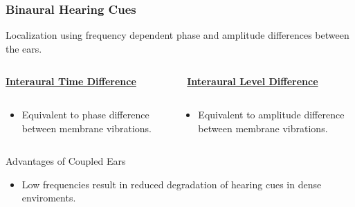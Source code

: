 \documentclass{beamer}
\begin{document}
\begin{frame}[t]
 \frametitle{Binaural Hearing Cues}
 Localization using frequency dependent phase and amplitude differences between the ears.
 \vspace{\baselineskip}
  \begin{columns}
 
    \begin{column}{0.5\textwidth}
    \centering
    \underline{\textbf{Interaural Time Difference}}

    \end{column}
     
    \begin{column}{0.5\textwidth}
    \centering
    \underline{\textbf{Interaural Level Difference}}
    \end{column}
    
  \end{columns}
  
    \begin{columns}
 
    \begin{column}{0.5\textwidth}
    \centering
    \small
     \begin{itemize}
    \item[] Equivalent to phase difference between membrane vibrations.
     \end{itemize}
    \end{column}
     
    \begin{column}{0.5\textwidth}
    \centering
    \small
     \begin{itemize}
          \item[] Equivalent to amplitude difference between membrane vibrations.
     \end{itemize}
    \end{column}
    
  \end{columns}
\end{frame}


\begin{frame}[t]
 \begin{exampleblock}{Advantages of Coupled Ears}
 \begin{itemize}
  \item Low frequencies result in reduced degradation of hearing cues in dense enviroments.
 \end{itemize}

  
 \end{exampleblock}

\end{frame}
\end{document}
